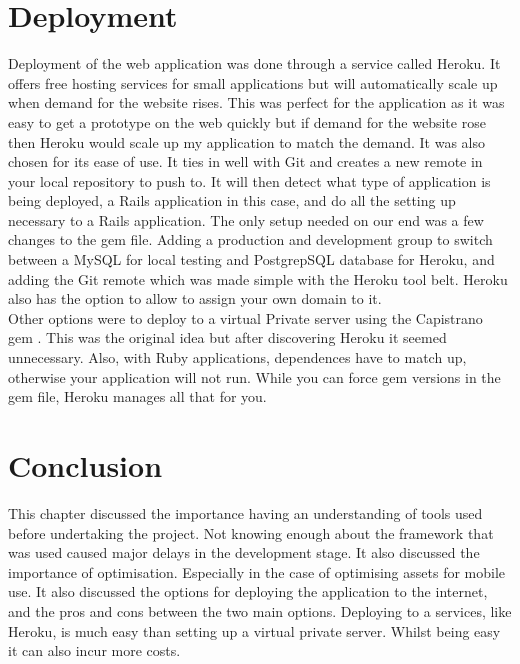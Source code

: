 \section{Deployment}
\label{sec:deployment}
Deployment of the web application was done through a service called Heroku. It offers free hosting services for small applications but will automatically scale up when demand for the website rises. This was perfect for the application as it was easy to get a prototype on the web quickly but if demand for the website rose then Heroku would scale up my application to match the demand. It was also chosen for its ease of use. It ties in well with Git and creates a new remote in your local repository to push to. It will then detect what type of application is being deployed, a Rails application in this case, and do all the setting up necessary to a Rails application. The only setup needed on our end was a few changes to the gem file. Adding a production and development group to switch between a MySQL \citep{mysql:1995} for local testing and PostgrepSQL \citep{postgres:1995} database for Heroku, and adding the Git remote which was made simple with the Heroku tool belt. Heroku also has the option to allow to assign your own domain to it.\\

Other options were to deploy to a virtual Private server using the Capistrano gem \citep{capistrano:2013}. This was the original idea but after discovering Heroku it seemed unnecessary. Also, with Ruby applications, dependences have to match up, otherwise your application will not run. While you can force gem versions in the gem file, Heroku manages all that for you.

\section{Conclusion}
This chapter discussed the importance having an understanding of tools used before undertaking the project. Not knowing enough about the framework that was used caused major delays in the development stage. It also discussed the importance of optimisation. Especially in the case of optimising assets for mobile use. It also discussed the options for deploying the application to the internet, and the pros and cons between the two main options. Deploying to a services, like Heroku, is much easy than setting up a virtual private server. Whilst being easy it can also incur more costs.